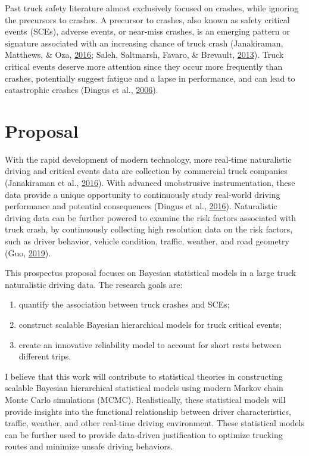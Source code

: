 \documentclass[12pt]{book}
\numberwithin{equation}{chapter}
\providecommand{\tightlist}{%
  \setlength{\itemsep}{0pt}\setlength{\parskip}{0pt}}
\begin{document}
Past truck safety literature almost exclusively focused on crashes, while ignoring the precursors to crashes. A precursor to crashes, also known as safety critical events (SCEs), adverse events, or near-miss crashes, is an emerging pattern or signature associated with an increasing chance of truck crash (Janakiraman, Matthews, \& Oza, \protect\hyperlink{ref-janakiraman2016discovery}{2016}; Saleh, Saltmarsh, Favaro, \& Brevault, \protect\hyperlink{ref-saleh2013accident}{2013}). Truck critical events deserve more attention since they occur more frequently than crashes, potentially suggest fatigue and a lapse in performance, and can lead to catastrophic crashes (Dingus et al., \protect\hyperlink{ref-dingus2006development}{2006}).

\hypertarget{proposal}{%
\section{Proposal}\label{proposal}}

With the rapid development of modern technology, more real-time naturalistic driving and critical events data are collection by commercial truck companies (Janakiraman et al., \protect\hyperlink{ref-janakiraman2016discovery}{2016}). With advanced unobstrusive instrumentation, these data provide a unique opportunity to continuously study real-world driving performance and potential consequences (Dingus et al., \protect\hyperlink{ref-dingus2016driver}{2016}). Naturalistic driving data can be further powered to examine the risk factors associated with truck crash, by continuously collecting high resolution data on the risk factors, such as driver behavior, vehicle condition, traffic, weather, and road geometry (Guo, \protect\hyperlink{ref-guo2019statistical}{2019}).

This prospectus proposal focuses on Bayesian statistical models in a large truck naturalistic driving data. The research goals are:

\begin{enumerate}
\def\labelenumi{\arabic{enumi})}
\tightlist
\item
  quantify the association between truck crashes and SCEs;
\item
  construct scalable Bayesian hierarchical models for truck critical events;
\item
  create an innovative reliability model to account for short rests between different trips.
\end{enumerate}

I believe that this work will contribute to statistical theories in constructing scalable Bayesian hierarchical statistical models using modern Markov chain Monte Carlo simulations (MCMC). Realistically, these statistical models will provide insights into the functional relationship between driver characteristics, traffic, weather, and other real-time driving environment. These statistical models can be further used to provide data-driven justification to optimize trucking routes and minimize unsafe driving behaviors.
\end{document}
